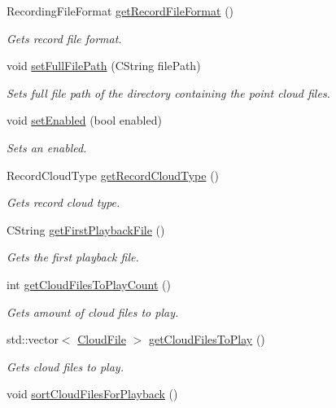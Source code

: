 \begin{DoxyCompactItemize}
Recording\+File\+Format \hyperlink{class_playback_configuration_af94ca3803d76a447aeea4ddc32936f39}{get\+Record\+File\+Format} ()
\begin{DoxyCompactList}\small\item\em Gets record file format. \end{DoxyCompactList}\item 
void \hyperlink{class_playback_configuration_a8f75a762f95c1374f488cf80d85a82f4}{set\+Full\+File\+Path} (C\+String file\+Path)
\begin{DoxyCompactList}\small\item\em Sets full file path of the directory containing the point cloud files. \end{DoxyCompactList}\item 
void \hyperlink{class_playback_configuration_ad3592d82088f471856f827325a1570ff}{set\+Enabled} (bool enabled)
\begin{DoxyCompactList}\small\item\em Sets an enabled. \end{DoxyCompactList}\item 
Record\+Cloud\+Type \hyperlink{class_playback_configuration_afc28ebd7eccf8ecfbd38c2986f11c0fe}{get\+Record\+Cloud\+Type} ()
\begin{DoxyCompactList}\small\item\em Gets record cloud type. \end{DoxyCompactList}\item 
C\+String \hyperlink{class_playback_configuration_abd176702d769917d91e2ceb0a6212596}{get\+First\+Playback\+File} ()
\begin{DoxyCompactList}\small\item\em Gets the first playback file. \end{DoxyCompactList}\item 
int \hyperlink{class_playback_configuration_a6561c9ade83eaadf67cc0eb17dd3b9e0}{get\+Cloud\+Files\+To\+Play\+Count} ()
\begin{DoxyCompactList}\small\item\em Gets amount of cloud files to play. \end{DoxyCompactList}\item 
std\+::vector$<$ \hyperlink{struct_cloud_file}{Cloud\+File} $>$ \hyperlink{class_playback_configuration_a985b80b60ba9f8f78db5f6a3d230c8c9}{get\+Cloud\+Files\+To\+Play} ()
\begin{DoxyCompactList}\small\item\em Gets cloud files to play. \end{DoxyCompactList}\item 
\hypertarget{class_playback_configuration_a5d268787e8c36e9f27122fb8e5b3788f}{}void \hyperlink{class_playback_configuration_a5d268787e8c36e9f27122fb8e5b3788f}{sort\+Cloud\+Files\+For\+Playback} ()\label{class_playback_configuration_a5d268787e8c36e9f27122fb8e5b3788f}


\end{DoxyCompactItemize}
